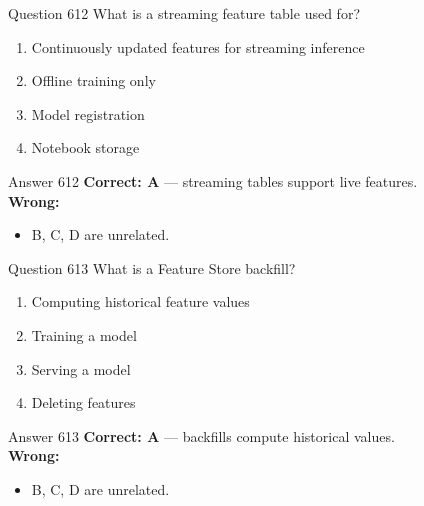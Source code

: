 \documentclass[aspectratio=169,11pt]{beamer}
\begin{document}
	\begin{frame}{Question 612}
		What is a streaming feature table used for?
		\begin{enumerate}[label=\Alph*.]
			\item Continuously updated features for streaming inference
			\item Offline training only
			\item Model registration
			\item Notebook storage
		\end{enumerate}
	\end{frame}
	\begin{frame}{Answer 612}
		\textbf{Correct: A} --- streaming tables support live features.\\
		\vspace{0.5em}
		\textbf{Wrong:}
		\begin{itemize}
			\item B, C, D are unrelated.
		\end{itemize}
	\end{frame}
	
	\begin{frame}{Question 613}
		What is a Feature Store backfill?
		\begin{enumerate}[label=\Alph*.]
			\item Computing historical feature values
			\item Training a model
			\item Serving a model
			\item Deleting features
		\end{enumerate}
	\end{frame}
	\begin{frame}{Answer 613}
		\textbf{Correct: A} --- backfills compute historical values.\\
		\vspace{0.5em}
		\textbf{Wrong:}
		\begin{itemize}
			\item B, C, D are unrelated.
		\end{itemize}
	\end{frame}
	
\end{document}
